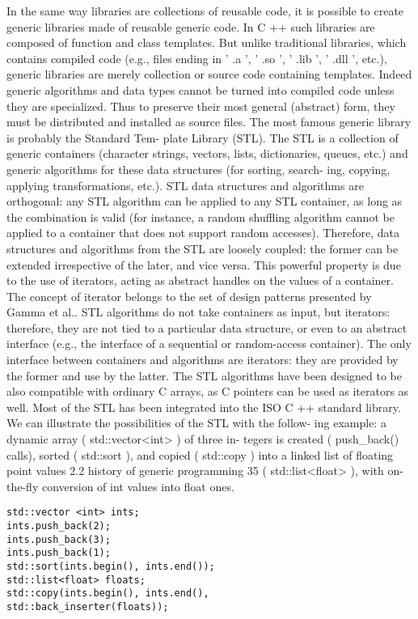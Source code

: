 In the same way libraries are collections of reusable code, it is
possible to create generic libraries made of reusable generic code.
In C ++ such libraries are composed of function and class templates.
But unlike traditional libraries, which contains compiled code (e.g.,
files ending in ' .a ', ' .so ', ' .lib ', ' .dll ', etc.), generic libraries are
merely collection or source code containing templates. Indeed
generic algorithms and data types cannot be turned into compiled
code unless they are specialized. Thus to preserve their most
general (abstract) form, they must be distributed and installed as
source files.
The most famous generic library is probably the Standard Tem-
plate Library (STL). The STL is a collection of generic containers
(character strings, vectors, lists, dictionaries, queues, etc.) and
generic algorithms for these data structures (for sorting, search-
ing, copying, applying transformations, etc.).
STL data structures and algorithms are orthogonal: any STL
algorithm can be applied to any STL container, as long as the
combination is valid (for instance, a random shuffling algorithm
cannot be applied to a container that does not support random
accesses). Therefore, data structures and algorithms from the
STL are loosely coupled: the former can be extended irrespective
of the later, and vice versa. This powerful property is due to
the use of iterators, acting as abstract handles on the values of
a container. The concept of iterator belongs to the set of design
patterns presented by Gamma et al.. STL algorithms do not
take containers as input, but iterators: therefore, they are not tied
to a particular data structure, or even to an abstract interface (e.g.,
the interface of a sequential or random-access container). The
only interface between containers and algorithms are iterators:
they are provided by the former and use by the latter. The
STL algorithms have been designed to be also compatible with
ordinary C arrays, as C pointers can be used as iterators as well.
Most of the STL has been integrated into the ISO C ++ standard
library.
We can illustrate the possibilities of the STL with the follow-
ing example: a dynamic array ( std::vector<int> ) of three in-
tegers is created ( push\_back() calls), sorted ( std::sort ), and
copied ( std::copy ) into a linked list of floating point values
2.2 history of generic programming 35
( std::list<float> ), with on-the-fly conversion of int values
into float ones.

\begin{verbatim}
std::vector <int> ints;
ints.push_back(2);
ints.push_back(3);
ints.push_back(1);
std::sort(ints.begin(), ints.end());
std::list<float> floats;
std::copy(ints.begin(), ints.end(),
std::back_inserter(floats));
\end{verbatim}

